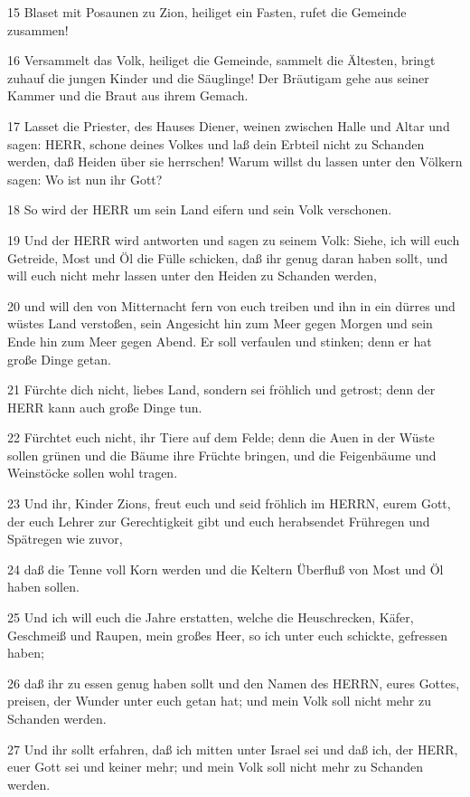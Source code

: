 \par 15 Blaset mit Posaunen zu Zion, heiliget ein Fasten, rufet die Gemeinde zusammen!
\par 16 Versammelt das Volk, heiliget die Gemeinde, sammelt die Ältesten, bringt zuhauf die jungen Kinder und die Säuglinge! Der Bräutigam gehe aus seiner Kammer und die Braut aus ihrem Gemach.
\par 17 Lasset die Priester, des Hauses Diener, weinen zwischen Halle und Altar und sagen: HERR, schone deines Volkes und laß dein Erbteil nicht zu Schanden werden, daß Heiden über sie herrschen! Warum willst du lassen unter den Völkern sagen: Wo ist nun ihr Gott?
\par 18 So wird der HERR um sein Land eifern und sein Volk verschonen.
\par 19 Und der HERR wird antworten und sagen zu seinem Volk: Siehe, ich will euch Getreide, Most und Öl die Fülle schicken, daß ihr genug daran haben sollt, und will euch nicht mehr lassen unter den Heiden zu Schanden werden,
\par 20 und will den von Mitternacht fern von euch treiben und ihn in ein dürres und wüstes Land verstoßen, sein Angesicht hin zum Meer gegen Morgen und sein Ende hin zum Meer gegen Abend. Er soll verfaulen und stinken; denn er hat große Dinge getan.
\par 21 Fürchte dich nicht, liebes Land, sondern sei fröhlich und getrost; denn der HERR kann auch große Dinge tun.
\par 22 Fürchtet euch nicht, ihr Tiere auf dem Felde; denn die Auen in der Wüste sollen grünen und die Bäume ihre Früchte bringen, und die Feigenbäume und Weinstöcke sollen wohl tragen.
\par 23 Und ihr, Kinder Zions, freut euch und seid fröhlich im HERRN, eurem Gott, der euch Lehrer zur Gerechtigkeit gibt und euch herabsendet Frühregen und Spätregen wie zuvor,
\par 24 daß die Tenne voll Korn werden und die Keltern Überfluß von Most und Öl haben sollen.
\par 25 Und ich will euch die Jahre erstatten, welche die Heuschrecken, Käfer, Geschmeiß und Raupen, mein großes Heer, so ich unter euch schickte, gefressen haben;
\par 26 daß ihr zu essen genug haben sollt und den Namen des HERRN, eures Gottes, preisen, der Wunder unter euch getan hat; und mein Volk soll nicht mehr zu Schanden werden.
\par 27 Und ihr sollt erfahren, daß ich mitten unter Israel sei und daß ich, der HERR, euer Gott sei und keiner mehr; und mein Volk soll nicht mehr zu Schanden werden.
